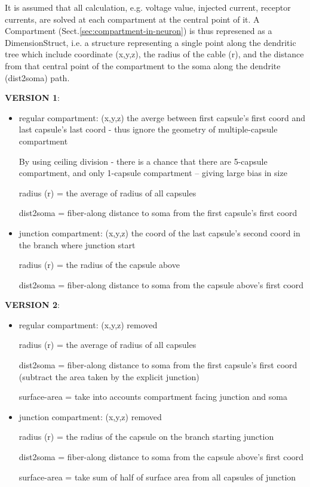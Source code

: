 It is assumed that all calculation, e.g. voltage value, injected current,
receptor currents, are solved at each compartment at the central point of it.
A Compartment (Sect.\ref{sec:compartment-in-neuron}) is thus represened as a
DimensionStruct, i.e. a structure representing a single point along the
dendritic tree which include coordinate (x,y,z), the radius of the cable (r),
and the distance from that central point of the compartment to the soma along
the dendrite (dist2soma) path.


{\bf VERSION 1}:
\begin{itemize}
  \item regular compartment: (x,y,z) the averge between first capsule's first
  coord and last capsule's last coord - thus ignore the geometry of
  multiple-capsule compartment
  
  By using ceiling division - there is a chance that there are 5-capsule
  compartment, and only 1-capsule compartment -- giving large bias in size
  
  radius (r) = the average of radius of all capsules
  
  dist2soma = fiber-along distance to soma from the first capsule's first coord
  
  \item junction compartment: (x,y,z) the coord of the last capsule's second
  coord in the branch where junction start
  
  radius (r) = the radius of the capsule above
  
  dist2soma = fiber-along distance to soma from the capsule above's first coord
  
\end{itemize}

{\bf VERSION 2}:
\begin{itemize}
  \item regular compartment: (x,y,z) removed
  
  radius (r) = the average of radius of all capsules
  
  dist2soma = fiber-along distance to soma from the first capsule's first coord
  (subtract the area taken by the explicit junction)
  
  surface-area = take into accounts compartment facing junction and soma
  
  \item junction compartment: (x,y,z) removed
  
  radius (r) = the radius of the capsule on the branch starting junction
  
  dist2soma = fiber-along distance to soma from the capsule above's first coord
  
  surface-area = take sum of half of surface area from all capsules of junction
   
\end{itemize}

